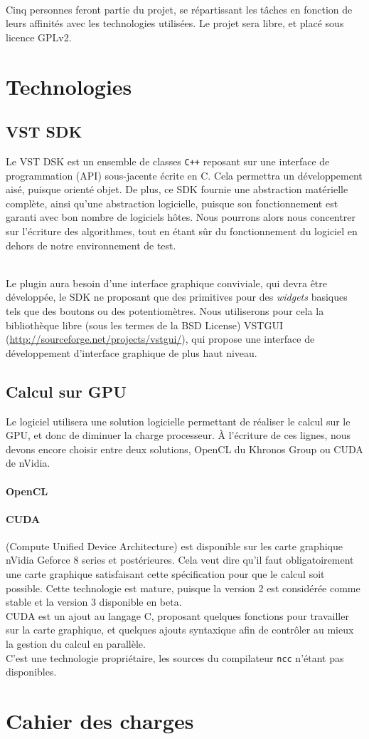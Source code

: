 ~\\
Cinq personnes feront partie du projet, se répartissant les tâches en fonction de leurs affinités avec les technologies utilisées.
Le projet sera libre, et placé sous licence GPLv2.
\section{Technologies}
\subsection{VST SDK}
Le VST DSK est un ensemble de classes {\tt C++} reposant sur une interface de programmation (API) sous-jacente écrite en C. Cela permettra un développement aisé, puisque orienté objet. De plus, ce SDK fournie une abstraction matérielle complète, ainsi qu'une abstraction logicielle, puisque son fonctionnement est garanti avec bon nombre de logiciels hôtes. Nous pourrons alors nous concentrer sur l'écriture des algorithmes, tout en étant sûr du fonctionnement du logiciel en dehors de notre environnement de test.

~\\
Le plugin aura besoin d'une interface graphique conviviale, qui devra être développée, le SDK ne proposant que des primitives pour des \emph{widgets} basiques tels que des boutons ou des potentiomètres. Nous utiliserons pour cela la bibliothèque libre (sous les termes de la BSD License) VSTGUI (\url{http://sourceforge.net/projects/vstgui/}), qui propose une interface de développement d'interface graphique de plus haut niveau.
\subsection{Calcul sur GPU}
Le logiciel utilisera une solution logicielle permettant de réaliser le calcul sur le GPU, et donc de diminuer la charge processeur.
À l'écriture de ces lignes, nous devons encore choisir entre deux solutions, OpenCL du Khronos Group ou CUDA de nVidia.
\paragraph{OpenCL}

\paragraph{CUDA}
(Compute Unified Device Architecture) est disponible sur les carte graphique nVidia Geforce 8 series et postérieures. Cela veut dire qu'il faut obligatoirement une carte graphique satisfaisant cette spécification pour que le calcul soit possible. Cette technologie est mature, puisque la version 2 est considérée comme stable et la version 3 disponible en beta.
~\\
CUDA est un ajout au langage C, proposant quelques fonctions pour travailler sur la carte graphique, et quelques ajouts syntaxique afin de contrôler au mieux la gestion du calcul en parallèle.
~\\
C'est une technologie propriétaire, les sources du compilateur {\tt ncc} n'étant pas disponibles.
\section{Cahier des charges}


